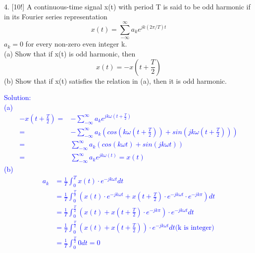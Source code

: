 \documentclass[12pt,a4paper]{article}
\begin{document}
\begin{tcolorbox}[colback = white]
4.  [10!] A continuous-time signal x(t) with period T is said to be odd harmonic if in its Fourier series representation\\
$$x(t)=\sum_{-\infty}^{\infty}a_ke^{jk(2\pi/T)t}$$
$a_k=0$ for every non-zero even integer k.\\
(a) Show that if x(t) is odd harmonic, then\\
$$x(t)=-x(t+\frac{T}{2})$$
(b) Show that if x(t) satisfies the relation in (a), then it is odd harmonic.
\end{tcolorbox}
\begin{tcolorbox}
\normalsize
\textcolor{blue}{Solution:\\
(a)
\begin{equation*}
    \begin{aligned}
        -x(t+\frac{T}{2})=&-\sum_{-\infty}^{\infty}a_ke^{jk\omega(t+\frac{T}{2})}\\
        =&-\sum_{-\infty}^{\infty}a_k(cos(k\omega(t+\frac{T}{2}))+sin(jk\omega(t+\frac{T}{2})))\\
        =&\sum_{-\infty}^{\infty}a_k(cos(k\omega t)+sin(jk\omega t))\\
        =&\sum_{-\infty}^{\infty}a_ke^{jk\omega(t)}=x(t)
    \end{aligned}
\end{equation*}
(b) $$
\begin{aligned}
a_{k} &=\frac{1}{T} \int_{0}^{T} x(t) \cdot e^{-j k \omega t} d t \\
&=\frac{1}{T} \int_{0}^{\frac{T}{2}}\left(x(t) \cdot e^{-j k \omega t}+x\left(t+\frac{T}{2}\right) \cdot e^{-j k \omega t} \cdot e^{-j k \pi}\right) d t \\
&=\frac{1}{T} \int_{0}^{\frac{T}{2}}\left(x(t)+x\left(t+\frac{T}{2}\right) \cdot e^{-j k \pi}\right) \cdot e^{-j k \omega t} d t\\
&=\frac{1}{T} \int_{0}^{\frac{T}{2}}\left(x(t)+x\left(t+\frac{T}{2}\right)\right) \cdot e^{-j k \omega t} d t \text{(k is integer)}\\
&=\frac{1}{T} \int_{0}^{\frac{T}{2}} 0 d t=0
\end{aligned}
$$     
}
\end{tcolorbox}
\end{document}
